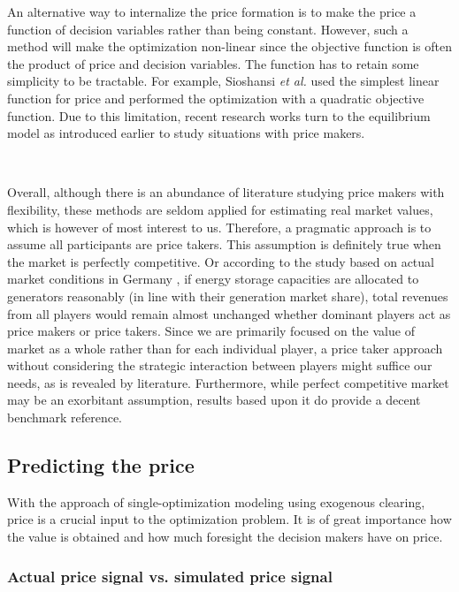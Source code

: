 An alternative way to internalize the price formation is to make the price a function of decision variables rather than being constant. However, such a method will make the optimization non-linear since the objective function is often the product of price and decision variables. The function has to retain some simplicity to be tractable. For example, Sioshansi \textit{et al.} \cite{Sioshansi2009,Sioshansi2010} used the simplest linear function for price and performed the optimization with a quadratic objective function. Due to this limitation, recent research works turn to the equilibrium model as introduced earlier to study situations with price makers. 

~\newline

Overall, although there is an abundance of literature studying price makers with flexibility, these methods are seldom applied for estimating real market values, which is however of most interest to us. Therefore, a pragmatic approach is to assume all participants are price takers. This assumption is definitely true when the market is perfectly competitive. Or according to the study based on actual market conditions in Germany \cite{Schill2011}, if energy storage capacities are allocated to generators reasonably (in line with their generation market share), total revenues from all players would remain almost unchanged whether dominant players act as price makers or price takers. Since we are primarily focused on the value of market as a whole rather than for each individual player, a price taker approach without considering the strategic interaction between players might suffice our needs, as is revealed by literature. Furthermore, while perfect competitive market may be an exorbitant assumption,  results based upon it do provide a decent benchmark reference.

\subsection{Predicting the price}

With the approach of single-optimization modeling using exogenous clearing, price is a crucial input to the optimization problem. It is of great importance how the value is obtained and how much foresight the decision makers have on price.

\subsubsection{Actual price signal vs. simulated price signal}

